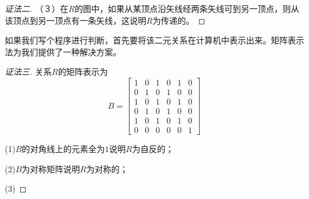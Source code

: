 \documentclass{book}[oneside]
\begin{document}
\begin{CJK*}{UTF8}{gbsn}
\begin{proof}[证法二]
  （３）在$R$的图中，如果从某顶点沿矢线经两条矢线可到另一顶点，则从该顶点到另一顶点有一条矢线，这说明$R$为传递的。

    \end{proof}
    如果我们写个程序进行判断，首先要将该二元关系在计算机中表示出来。矩阵表示法为我们提供了一种解决方案。
    \begin{proof}[证法三]
      关系$R$的矩阵表示为
      \[B=\begin{bmatrix}
          1&0&1&0&1&0\\
          0&1&0&1&0&0\\
          1&0&1&0&1&0\\
          0&1&0&1&0&0\\
          1&0&1&0&1&0\\
          0&0&0&0&0&1
        \end{bmatrix}
      \]

      (1)$B$的对角线上的元素全为$1$说明$R$为自反的；

      (2)$B$为对称矩阵说明$R$为对称的；

      (3)


\end{proof}
\end{CJK*}
\end{document}
